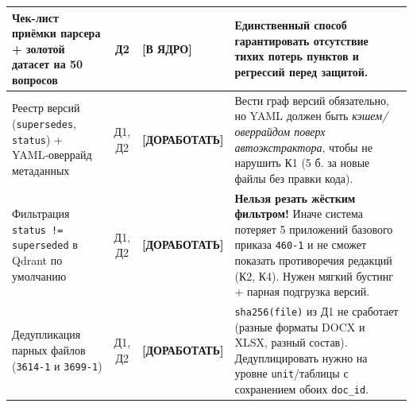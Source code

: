 \documentclass[10pt,a4paper]{article}
\newcommand{\keep}{\textbf{\textcolor{GreenTag}{[В ЯДРО]}}}
\newcommand{\modify}{\textbf{\textcolor{AmberTag}{[ДОРАБОТАТЬ]}}}
\begin{document}
{\begin{tabularx}{\textwidth}{@{} >{\raggedright\arraybackslash}p{} c >{\raggedright\arraybackslash}p{} >{\raggedright\arraybackslash}X @{}}
Чек-лист приёмки парсера + золотой датасет на 50 вопросов & Д2 & \keep & Единственный способ гарантировать отсутствие тихих потерь пунктов и регрессий перед защитой. \\
\midrule
Реестр версий (\texttt{supersedes}, \texttt{status}) + YAML-оверрайд метаданных & Д1, Д2 & \modify & Вести граф версий обязательно, но YAML должен быть \emph{кэшем/оверрайдом поверх автоэкстрактора}, чтобы не нарушить К1 (5 б. за новые файлы без правки кода). \\
Фильтрация \texttt{status != superseded} в Qdrant по умолчанию & Д1, Д2 & \modify & \textbf{Нельзя резать жёстким фильтром!} Иначе система потеряет 5 приложений базового приказа \texttt{460-1} и не сможет показать противоречия редакций (К2, К4). Нужен мягкий бустинг + парная подгрузка версий. \\
Дедупликация парных файлов (\texttt{3614-1} и \texttt{3699-1}) & Д1, Д2 & \modify & \texttt{sha256(file)} из Д1 не сработает (разные форматы DOCX и XLSX, разный состав). Дедуплицировать нужно на уровне \texttt{unit}/таблицы с сохранением обоих \texttt{doc\_id}. \\
\bottomrule
\end{tabularx}

}
\end{document}
